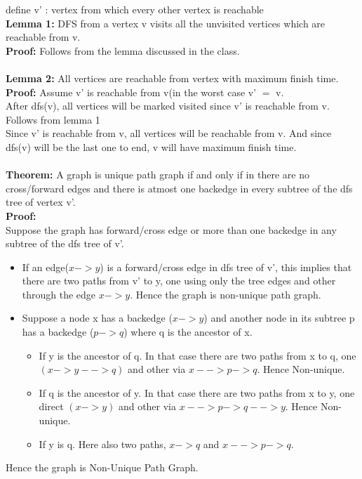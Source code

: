 \documentclass{article}
\begin{document}
define v' : vertex from which every other vertex is reachable\\
\textbf{Lemma 1:} DFS from a vertex v visits all the unvisited vertices which are reachable from v.\\
\textbf{Proof:} Follows from the lemma discussed in the class.\\
\\
\textbf{Lemma 2:} All vertices are reachable from vertex with maximum finish time.\\
\textbf{Proof:} Assume v' is reachable from v(in the worst case v' $=$ v.\\
After dfs(v), all vertices will be marked visited since v' is reachable from v. \hspace*{2cm}Follows from lemma 1\\
Since v' is reachable from v, all vertices will be reachable from v. And since dfs(v) will be the last one to end, v will have maximum finish time. \\
\\
\textbf{Theorem:} A graph is unique path graph if and only if in there are no cross/forward edges and there is atmost one backedge in every subtree of the dfs tree of vertex v'.\\
\textbf{Proof:} \\
Suppose the graph has forward/cross edge or more than one backedge in any subtree of the dfs tree of v'. 
\begin{itemize}
\item If an edge($x -> y$) is a forward/cross edge in dfs tree of v', this implies that there are two paths from v' to y, one using only the tree edges and other through the edge $x->y$. Hence the graph is non-unique path graph.
\item Suppose a node x has a backedge ($x->y$) and another node in its subtree p has a backedge ($p->q$) where q is the ancestor of x. 
\begin{itemize}
\item If y is the ancestor of q. In that case there are two paths from x to q, one  $(x->y-->q)$ and other via $x-->p->q$. Hence Non-unique.
\item If q is the ancestor of y. In that case there are two paths from x to y, one direct $(x->y)$ and other via $x-->p->q-->y$. Hence Non-unique.  
\item If y is q. Here also two paths, $x->q$ and $x-->p->q$.
\end{itemize}
\end{itemize}
Hence the graph is Non-Unique Path Graph.\\
\end{document}

